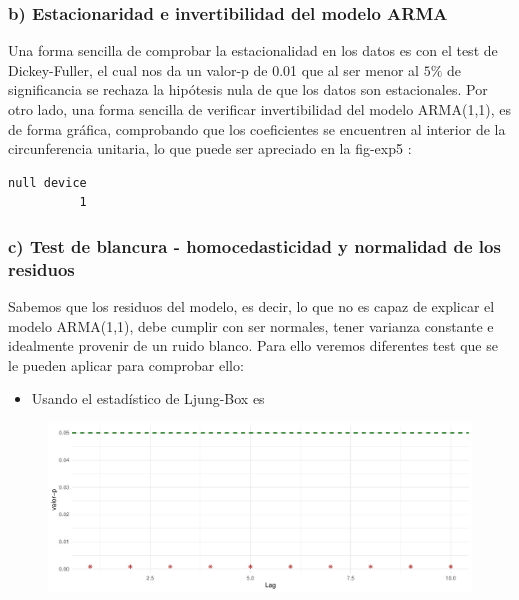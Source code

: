 \documentclass[
  letterpaper,
  DIV=11,
  numbers=noendperiod,
  twocolumn]{scrartcl}
\providecommand{\tightlist}{%
  \setlength{\itemsep}{0pt}\setlength{\parskip}{0pt}}\usepackage{longtable,booktabs,array}
\begin{document}
\hypertarget{b-estacionaridad-e-invertibilidad-del-modelo-arma}{%
\subsubsection{b) Estacionaridad e invertibilidad del modelo
ARMA}\label{b-estacionaridad-e-invertibilidad-del-modelo-arma}}

Una forma sencilla de comprobar la estacionalidad en los datos es con el
test de Dickey-Fuller, el cual nos da un valor-p de 0.01 que al ser
menor al \(5\%\) de significancia se rechaza la hipótesis nula de que
los datos son estacionales. Por otro lado, una forma sencilla de
verificar invertibilidad del modelo ARMA(1,1), es de forma gráfica,
comprobando que los coeficientes se encuentren al interior de la
circunferencia unitaria, lo que puede ser apreciado en la fig-exp5 :

\begin{verbatim}
null device 
          1 
\end{verbatim}

\hypertarget{c-test-de-blancura---homocedasticidad-y-normalidad-de-los-residuos}{%
\subsubsection{c) Test de blancura - homocedasticidad y normalidad de
los
residuos}\label{c-test-de-blancura---homocedasticidad-y-normalidad-de-los-residuos}}

Sabemos que los residuos del modelo, es decir, lo que no es capaz de
explicar el modelo ARMA(1,1), debe cumplir con ser normales, tener
varianza constante e idealmente provenir de un ruido blanco. Para ello
veremos diferentes test que se le pueden aplicar para comprobar ello:

\begin{itemize}
\tightlist
\item
  Usando el estadístico de Ljung-Box es
\end{itemize}

\begin{figure}[H]

{\centering \includegraphics{CopyOfpdf_tarea2_files/figure-pdf/unnamed-chunk-10-1.pdf}

}

\end{figure}
\end{document}
